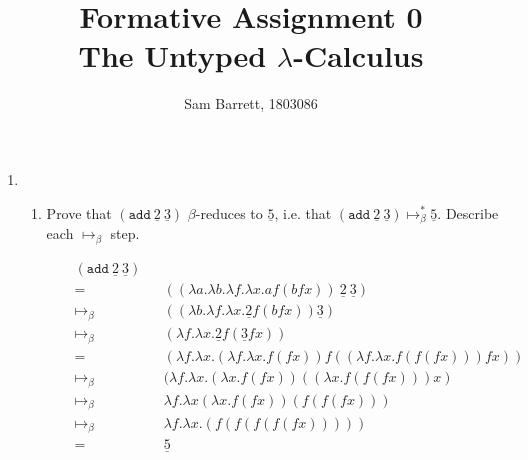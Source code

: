 \documentclass[11pt]{article}
\title{Formative Assignment 0 \\ The Untyped $\lambda$-Calculus}
\author{Sam Barrett, 1803086}
\begin{document}
\maketitle

\begin{enumerate}

	\item
	      \begin{enumerate}
		      \item Prove that $(\texttt{add}\: \underline{2} \: \underline{3})$ $\beta$-reduces to $\underline{5}$, i.e. that $(\texttt{add}\: \underline{2} \: \underline{3}) \mapsto^*_{\beta} \underline{5}$. Describe each $\mapsto_\beta$ step.


		            \begin{align*}
			             &  & (\texttt{add} \: \underline{2} \: \underline{3}) &                                                                                                     \\
			             &  & =                                                &   & ((\lambda a.\lambda b. \lambda f. \lambda x. a f ( b f x)) \: \underline{2} \: \underline{3}) & \\
			             &  & \mapsto_\beta                                    &   & ((\lambda b. \lambda f . \lambda x . \underline{2} f (b f x))\underline{3})                   & \\
			             &  & \mapsto_\beta                                    &   & (\lambda f. \lambda x. \underline{2}f(\underline{3} f x))                                     & \\
			             &  & =                                                &   & (\lambda f. \lambda x. (\lambda f.\lambda x.f(f x))f((\lambda f.\lambda x. f(f(f x)))f x))    & \\
			             &  & \mapsto_\beta                                    &   & ( \lambda f. \lambda x. ( \lambda x. f ( f x))(( \lambda x. f(f(f x)))x)                      & \\
			             &  & \mapsto_\beta                                    &   & \lambda f. \lambda x ( \lambda x. f (f x))(f ( f(f x)))                                       & \\
			             &  & \mapsto_\beta                                    &   & \lambda f. \lambda x.(f (f (f(f(f x)))))                                                      & \\
			             &  & =                                                &   & \underline{5}
		            \end{align*}



\end{enumerate}
\end{enumerate}
\end{document}
